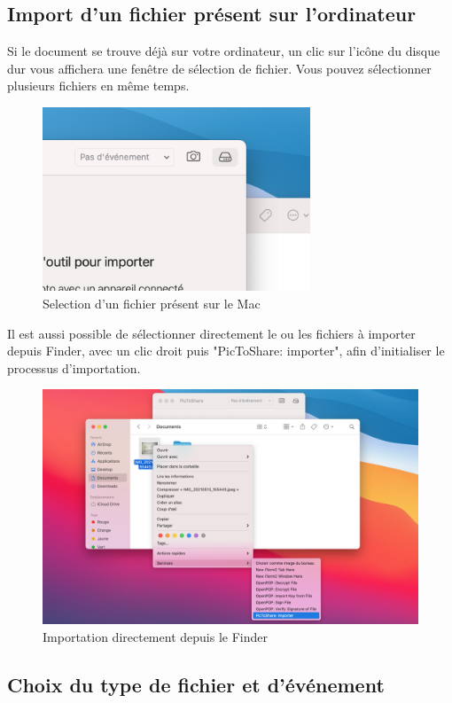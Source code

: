 \documentclass[a4paper,11pt]{article}
\begin{document}
	
	\subsection{Import d'un fichier présent sur l'ordinateur}
	
	Si le document se trouve déjà sur votre ordinateur, un clic sur l'icône du disque dur vous affichera une fenêtre de sélection de fichier. Vous pouvez sélectionner plusieurs fichiers en même temps.
		\begin{figure}[h]
			\centering
			\includegraphics[width=8cm]{DD_import}
			\caption{Selection d'un fichier présent sur le Mac}
		\end{figure}
	
	Il est aussi possible de sélectionner directement le ou les fichiers à importer depuis Finder, avec un clic droit puis "PicToShare: importer", afin d'initialiser le processus d'importation.
	
	\begin{figure}[h]
		\centering
		\includegraphics[width=13cm]{Right_click_shortcut}
		\caption{Importation directement depuis le Finder}
	\end{figure}
	
	\subsection{Choix du type de fichier et d'événement}
	
\end{document}
